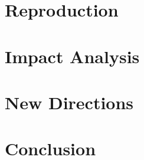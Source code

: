 \documentclass[a4paper]{article}
\begin{document}
\begin{multicols}{2}
\section{Reproduction}
\hspace*{\parindent}\blindtext

\section{Impact Analysis}
\hspace*{\parindent}\blindtext

\section{New Directions}
\hspace*{\parindent}\blindtext

\section{Conclusion}
\hspace*{\parindent}\blindtext

\end{multicols}

\newpage
\printbibliography %
\end{document}
